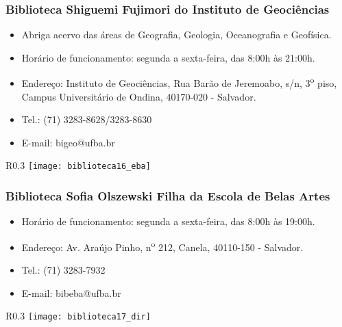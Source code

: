     \subsubsection{Biblioteca Shiguemi Fujimori do Instituto de Geociências}
        \begin{itemize}
            \item Abriga acervo das áreas de Geografia, Geologia, Oceanografia e Geofísica.
            \item Horário de funcionamento: segunda a sexta-feira, das 8:00h às 21:00h.
            \item Endereço: Instituto de Geociências, Rua Barão de Jeremoabo, s/n, 3\textsuperscript{o} piso, Campus Universitário de Ondina, 40170-020 - Salvador.
            \item Tel.: (71) 3283-8628/3283-8630
            \item E-mail: bigeo@ufba.br
        \end{itemize}
        \newpage
        \begin{wrapfigure}{R}{0.3\textwidth}
            \centering
            \texttt{[image: biblioteca16\_eba]}
        \end{wrapfigure}
    \subsubsection{Biblioteca Sofia Olszewski Filha da Escola de Belas Artes}
        \begin{itemize}
            \item Horário de funcionamento: segunda a sexta-feira, das 8:00h às 19:00h.
            \item Endereço: Av. Araújo Pinho, n\textsuperscript{o} 212, Canela, 40110-150 - Salvador.
            \item Tel.: (71) 3283-7932
            \item E-mail: bibeba@ufba.br
        \end{itemize}
        \begin{wrapfigure}{R}{0.3\textwidth}
            \centering
            \texttt{[image: biblioteca17\_dir]}
        \end{wrapfigure}
